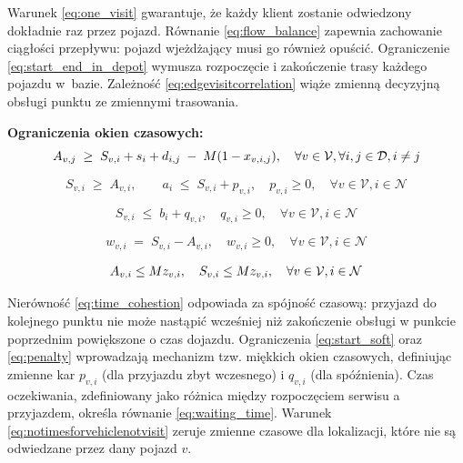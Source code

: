 Warunek \eqref{eq:one_visit} gwarantuje, że każdy klient zostanie odwiedzony dokładnie raz przez pojazd. Równanie \eqref{eq:flow_balance} zapewnia zachowanie ciągłości przepływu: pojazd wjeżdżający musi go również opuścić. Ograniczenie \eqref{eq:start_end_in_depot} wymusza rozpoczęcie i zakończenie trasy każdego pojazdu w~bazie. Zależność \eqref{eq:edgevisitcorrelation} wiąże zmienną decyzyjną obsługi punktu ze zmiennymi trasowania.

\textbf{Ograniczenia okien czasowych:}
\begin{equation}{\label{eq:time_cohestion}}
 A_{v,j} \; \ge \; S_{v,i} + s_i + d_{i,j} \;-\; M(1 - x_{v,i,j}), \quad \forall v \in \mathcal{V}, \forall i,j \in \mathcal{D}, i\neq j
\end{equation}

\begin{equation}\label{eq:start_soft}
S_{v,i} \;\ge\; A_{v,i}, \qquad a_i \;\le\; S_{v,i} + p_{v,i}, \quad p_{v,i}\ge 0, \quad \forall v \in \mathcal{V}, i \in \mathcal{N}
\end{equation}

\begin{equation}\label{eq:penalty}
S_{v,i} \;\le\; b_i + q_{v,i}, \quad q_{v,i}\ge 0, \quad \forall v \in \mathcal{V}, i \in \mathcal{N}
\end{equation}

\begin{equation}\label{eq:waiting_time}
w_{v,i} \;=\; S_{v,i} - A_{v,i}, \quad w_{v,i}\ge 0, \quad \forall v \in \mathcal{V}, i \in \mathcal{N}
\end{equation}

\begin{equation}{\label{eq:notimesforvehiclenotvisit}}
    A_{v,i}\leq M z_{v,i}, \quad S_{v,i}\leq M z_{v,i}, \quad \forall v \in \mathcal{V}, i \in \mathcal{N}
\end{equation}

Nierówność \eqref{eq:time_cohestion} odpowiada za spójność czasową: przyjazd do kolejnego punktu nie może nastąpić wcześniej niż zakończenie obsługi w punkcie poprzednim powiększone o czas dojazdu. Ograniczenia \eqref{eq:start_soft} oraz \eqref{eq:penalty} wprowadzają mechanizm tzw. miękkich okien czasowych, definiując zmienne kar $p_{v,i}$ (dla przyjazdu zbyt wczesnego) i $q_{v,i}$ (dla spóźnienia). Czas oczekiwania, zdefiniowany jako różnica między rozpoczęciem serwisu a przyjazdem, określa równanie \eqref{eq:waiting_time}. Warunek \eqref{eq:notimesforvehiclenotvisit} zeruje zmienne czasowe dla lokalizacji, które nie są odwiedzane przez dany pojazd $v$.

